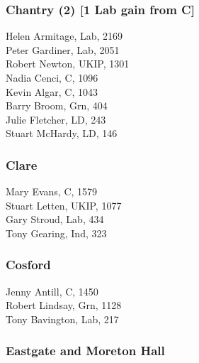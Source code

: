 \documentclass[a4paper,openany,10pt]{book}
\begin{document}
\subsubsection*{Chantry (2) \hspace*{\fill}\nolinebreak[1]%
\enspace\hspace*{\fill}
[1 Lab gain from C]}



Helen Armitage, Lab, 2169\\
Peter Gardiner, Lab, 2051\\
Robert Newton, UKIP, 1301\\
Nadia Cenci, C, 1096\\
Kevin Algar, C, 1043\\
Barry Broom, Grn, 404\\
Julie Fletcher, LD, 243\\
Stuart McHardy, LD, 146\\


\subsubsection*{Clare}



Mary Evans, C, 1579\\
Stuart Letten, UKIP, 1077\\
Gary Stroud, Lab, 434\\
Tony Gearing, Ind, 323\\


\subsubsection*{Cosford}



Jenny Antill, C, 1450\\
Robert Lindsay, Grn, 1128\\
Tony Bavington, Lab, 217\\


\subsubsection*{Eastgate and Moreton Hall}

\end{document}
